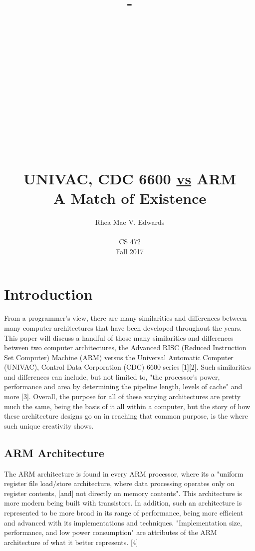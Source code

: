 \documentclass[letterpaper,10pt,onecolumn,compsoc]{IEEEtran}
\title{-\\ ~ \\ ~ \\ ~ \\ ~ \\ ~ \\ ~ \\ ~ \\ ~ \\UNIVAC, CDC 6600 \uline{vs} ARM\\A Match of Existence}
\author{Rhea Mae V. Edwards\\ ~ \\CS 472\\Fall 2017}
\begin{document}

\maketitle

\newpage


\tableofcontents

\newpage


\section{Introduction}

\noindent
From a programmer's view, there are many similarities and differences between many computer architectures that have been developed throughout the years. This paper will discuss a handful of those many similarities and differences between two computer architectures, the Advanced RISC (Reduced Instruction Set Computer) Machine (ARM) versus the Universal Automatic Computer (UNIVAC), Control Data Corporation (CDC) 6600 series [1][2]. Such similarities and differences can include, but not limited to, "the processor's power, performance and area by determining the pipeline length, levels of cache" and more [3]. Overall, the purpose for all of these varying architectures are pretty much the same, being the basis of it all within a computer, but the story of how these architecture designs go on in reaching that common purpose, is the where such unique creativity shows.

\subsection{ARM Architecture}

\noindent
The ARM architecture is found in every ARM processor, where its a "uniform register file load/store architecture, where data processing  operates only on register contents, [and] not directly on memory contents". This architecture is more modern being built with transistors. In addition, such an architecture is represented to be more broad in its range of performance, being more efficient and advanced with its implementations and techniques. "Implementation size, performance, and low power consumption" are attributes of the ARM architecture of what it better represents. [4]
\end{document}
